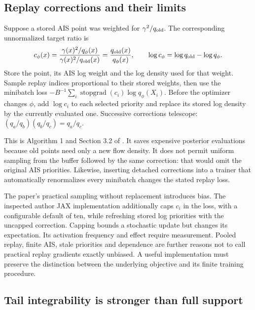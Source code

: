 \subsection{Replay corrections and their limits}

Suppose a stored AIS point was weighted for
$\gamma^2/q_{\rm old}$. The corresponding unnormalized target ratio is
\begin{equation}
 c_\phi(x)=\frac{\gamma(x)^2/q_\phi(x)}
                 {\gamma(x)^2/q_{\rm old}(x)}
 =\frac{q_{\rm old}(x)}{q_\phi(x)},\qquad
 \log c_\phi=\log q_{\rm old}-\log q_\phi.
 \label{eq:bf-fab-replay}
\end{equation}
Store the point, its AIS log weight and the log density used for that weight.
Sample replay indices proportional to their stored weights, then use the
minibatch loss $-B^{-1}\sum_i\operatorname{stopgrad}(c_i)\log q_\phi(X_i)$.
Before the optimizer changes $\phi$, add $\log c_i$ to each selected priority
and replace its stored log density by the currently evaluated one. Successive
corrections telescope: $(q_a/q_b)(q_b/q_c)=q_a/q_c$.

This is Algorithm 1 and Section 3.2 of \citet{midgley2023fab}. It saves expensive
posterior evaluations because old points need only a new flow density. It does
not permit uniform sampling from the buffer followed by the same correction:
that would omit the original AIS priorities. Likewise, inserting detached
corrections into a trainer that automatically renormalizes every minibatch
changes the stated replay loss.

The paper's practical sampling without replacement introduces bias. The
inspected author JAX implementation additionally caps $c_i$ in the loss, with a
configurable default of ten, while refreshing stored log priorities with the
uncapped correction. Capping bounds a stochastic update but changes its
expectation. Its activation frequency and effect require measurement. Pooled
replay, finite AIS, stale priorities and dependence are further reasons not to
call practical replay gradients exactly unbiased. A useful implementation must
preserve the distinction between the underlying objective and its finite
training procedure.

\subsection{Tail integrability is stronger than full support}

